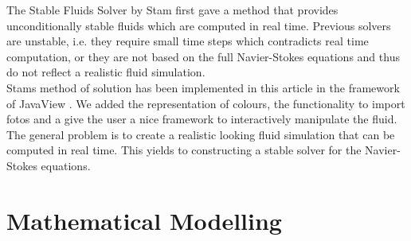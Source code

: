 \documentclass[a4paper,10pt,oneside,final,german,openbib,pdftex,titlepage]{scrbook}
\begin{document}
The Stable Fluids Solver by Stam \cite{Stam} first gave a method that provides unconditionally stable fluids which are computed in real time. Previous solvers are unstable, i.e. they require small time steps which contradicts real time computation, or they are not based on the full Navier-Stokes equations and thus do not reflect a realistic fluid simulation.\\

Stams method of solution has been implemented in this article in the framework of JavaView \cite{JavaView}. We added the representation of colours, the functionality to import fotos and a give the user a nice framework to interactively manipulate the fluid.\\

The general problem is to create a realistic looking fluid simulation that can be computed in real time. This yields to constructing a stable solver for the Navier-Stokes equations.
 
\chapter{Mathematical Modelling} \label{Section:Mathematical Modelling} \label{chapter:Math}
\end{document}
